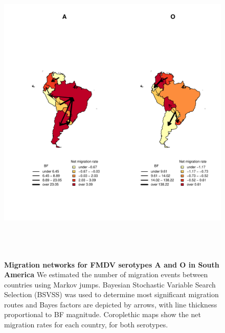 \documentclass[10pt]{article}
\begin{document}
\newpage
\begin{figure}[!ht]
\begin{center}
\includegraphics[width=15cm,height=15cm]{FIGURES/compound.pdf}
\end{center}
\caption{
{\bf Migration networks for FMDV serotypes A and O in South America} We estimated the number of migration events between countries using Markov jumps.  Bayesian Stochastic Variable Search Selection (BSVSS) was used to determine most significant migration routes and Bayes factors are depicted by arrows, with line thickness proportional to BF magnitude. Coroplethic maps show the net migration rates for each country, for both serotypes.\\
}
\label{fig:mj&BFs}
\end{figure}
\end{document}
